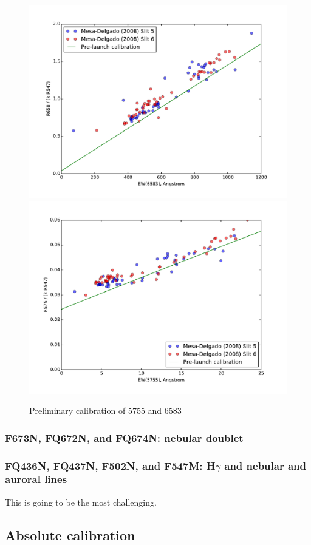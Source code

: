 \documentclass[preprint, 10pt]{aastex}
\begin{document}
\begin{figure}
  \centering
  \includegraphics[width=0.8\linewidth]{adal-w6583-calibration}
  \includegraphics[width=0.8\linewidth]{adal-w5755-calibration}
  \caption{Preliminary calibration of 5755 and 6583}
  \label{fig:adal}
\end{figure}

\subsubsection{F673N, FQ672N, and FQ674N: \sii{} nebular doublet}
\label{sec:673-672-674}

\subsubsection{FQ436N, FQ437N, F502N, and F547M: H\(\gamma\) and
  \oiii{} nebular and auroral lines}
\label{sec:437}
This is going to be the most challenging. 


\subsection{Absolute calibration}
\label{sec:absolute}
\end{document}
